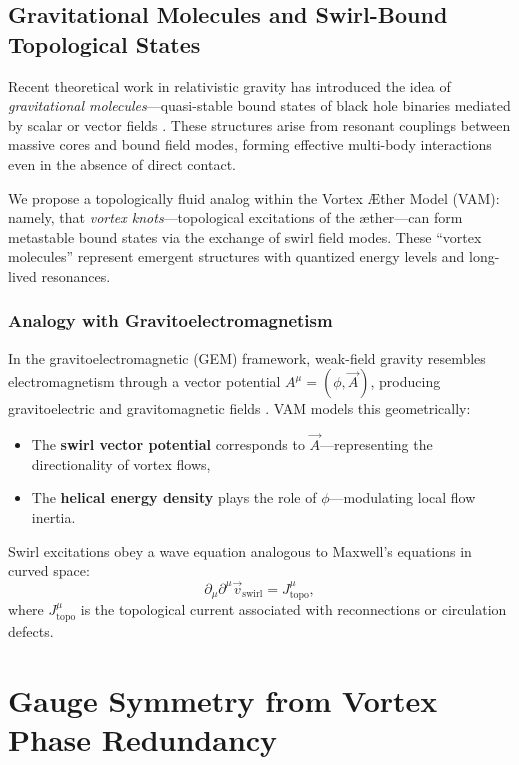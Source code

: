 \subsection{Gravitational Molecules and Swirl-Bound Topological States}

Recent theoretical work in relativistic gravity has introduced the idea of \textit{gravitational molecules}—quasi-stable bound states of black hole binaries mediated by scalar or vector fields \cite{baumann2023black}. These structures arise from resonant couplings between massive cores and bound field modes, forming effective multi-body interactions even in the absence of direct contact.

We propose a topologically fluid analog within the Vortex Æther Model (VAM): namely, that \textit{vortex knots}—topological excitations of the æther—can form metastable bound states via the exchange of swirl field modes. These ``vortex molecules'' represent emergent structures with quantized energy levels and long-lived resonances.

\subsubsection*{Analogy with Gravitoelectromagnetism}

In the gravitoelectromagnetic (GEM) framework, weak-field gravity resembles electromagnetism through a vector potential $A^\mu = (\phi, \vec{A})$, producing gravitoelectric and gravitomagnetic fields \cite{mashhoon2001gravito}. VAM models this geometrically:
\begin{itemize}
    \item The \textbf{swirl vector potential} corresponds to $\vec{A}$—representing the directionality of vortex flows,
    \item The \textbf{helical energy density} plays the role of $\phi$—modulating local flow inertia.
\end{itemize}

Swirl excitations obey a wave equation analogous to Maxwell's equations in curved space:
\begin{equation}
\partial_\mu \partial^\mu \vec{v}_\text{swirl} = J^\mu_{\text{topo}},
\end{equation}
where $J^\mu_{\text{topo}}$ is the topological current associated with reconnections or circulation defects.

\section*{Gauge Symmetry from Vortex Phase Redundancy}

